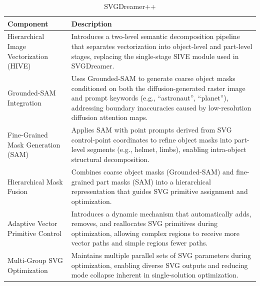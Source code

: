 \begin{table}[h!]
\centering
\caption{SVGDreamer++}
\begin{tabular}{|l|p{10cm}|}
\hline
\textbf{Component} & \textbf{Description} \\ \hline

Hierarchical Image Vectorization (HIVE) &
Introduces a two-level semantic decomposition pipeline that separates vectorization into object-level and part-level stages, replacing the single-stage SIVE module used in SVGDreamer. \\ \hline

Grounded-SAM Integration &
Uses Grounded-SAM to generate coarse object masks conditioned on both the diffusion-generated raster image and prompt keywords (e.g., “astronaut”, “planet”), addressing boundary inaccuracies caused by low-resolution diffusion attention maps. \\ \hline

Fine-Grained Mask Generation (SAM) &
Applies SAM with point prompts derived from SVG control-point coordinates to refine object masks into part-level segments (e.g., helmet, limbs), enabling intra-object structural decomposition. \\ \hline

Hierarchical Mask Fusion &
Combines coarse object masks (Grounded-SAM) and fine-grained part masks (SAM) into a hierarchical representation that guides SVG primitive assignment and optimization. \\ \hline

Adaptive Vector Primitive Control &
Introduces a dynamic mechanism that automatically adds, removes, and reallocates SVG primitives during optimization, allowing complex regions to receive more vector paths and simple regions fewer paths. \\ \hline

Multi-Group SVG Optimization &
Maintains multiple parallel sets of SVG parameters during optimization, enabling diverse SVG outputs and reducing mode collapse inherent in single-solution optimization. \\ \hline

\end{tabular}
\end{table}



